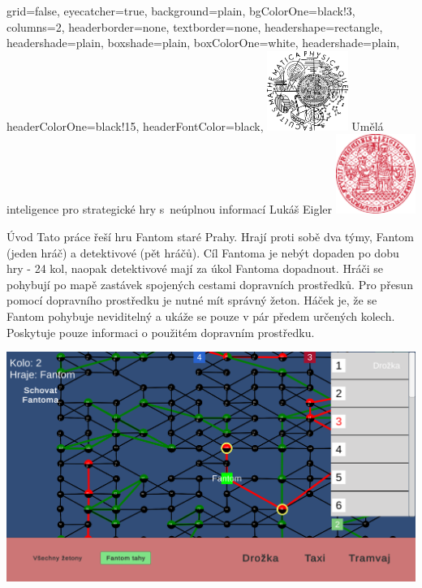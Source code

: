 \documentclass[portrait,a0paper,fontscale=0.25]{baposter}
\begin{document}
\color{black!80} %
\begin{poster}{grid=false,
	eyecatcher=true,
	background=plain,
	bgColorOne=black!3, %
	columns=2,
	headerborder=none,
	textborder=none,
	headershape=rectangle,
	headershade=plain,
	boxshade=plain,
	boxColorOne=white,
	headershade=plain,
	headerColorOne=black!15, %
	headerFontColor=black,
	}%
	{\includegraphics[height=7em]{logos/mff-black.pdf}}
	{Umělá inteligence pro strategické hry s~neúplnou informací}
	{\vspace{1ex} Lukáš Eigler}
	{\includegraphics[height=7em]{logos/uk-red.pdf}}


%
%

\begin{posterbox}[column=0,name=background]{Úvod}
Tato práce řeší hru Fantom staré Prahy. Hrají proti sobě dva týmy, Fantom (jeden hráč) a detektivové (pět hráčů). Cíl Fantoma je nebýt dopaden po dobu hry - 24 kol, naopak detektivové mají za úkol Fantoma dopadnout. Hráči se pohybují po mapě zastávek spojených cestami dopravních prostředků. Pro přesun pomocí dopravního prostředku je nutné mít správný žeton. Háček je, že se Fantom pohybuje neviditelný a ukáže se pouze v pár předem určených kolech. Poskytuje pouze informaci o použitém dopravním prostředku.

\begin{center}
\includegraphics[width=0.7\linewidth]{img/ingame_view.png}
\end{center}


\end{posterbox}
\end{poster}
\end{document}
